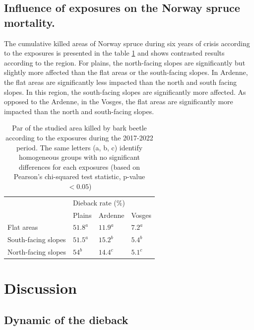 \documentclass[3p,procedia]{elsarticle}
\begin{document}
\subsection{Influence of  exposures on the Norway spruce mortality.}
The cumulative killed areas of Norway spruce during six years of crisis according to the exposures is presented in the table \ref{tab_or_topo} and shows contrasted results according to the region. 
For plains, the north-facing slopes are significantly but slightly more  affected than the flat areas  or the south-facing slopes.
In Ardenne, the flat areas  are significantly less impacted than the north and south facing slopes. 
In this region, the south-facing slopes are significantly more affected. 
As opposed to the Ardenne, in the Vosges, the flat areas  are significantly more impacted than the north and south-facing slopes.
\begin{table}[htbp]
\caption{Par of the studied area killed by bark beetle according to the exposures during the 2017-2022 period.
The same letters (a, b, c) identify homogeneous groups with no significant differences for each exposures  (based on  Pearson's chi-squared test statistic, p-value $< 0.05$)}
\label{tab_or_topo}

\begin{tabular}{|l|lll|}
\hline
\multirow{2}{*}{}  & \multicolumn{3}{l|}{Dieback rate (\%)}                             \\ \cline{2-4} 
                   & \multicolumn{1}{l|}{Plains} & \multicolumn{1}{l|}{Ardenne} & Vosges \\ \hline
Flat areas             & \multicolumn{1}{l|}{$51.8^a$ }    & \multicolumn{1}{l|}{$11.9^a$}    & $7.2^a$   \\ \hline
South-facing slopes & \multicolumn{1}{l|}{$51.5^a$}   & \multicolumn{1}{l|}{$15.2^b$}    & $5.4^b$    \\ \hline
North-facing slopes & \multicolumn{1}{l|}{$54^b$}   & \multicolumn{1}{l|}{$14.4^c$}    & $5.1^c$   \\ \hline
\end{tabular}
\end{table}


\section{Discussion}


   
 
\subsection{Dynamic of the dieback}
\end{document}
